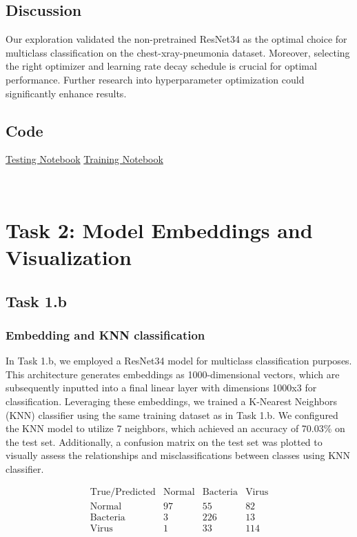 \documentclass{article}
\begin{document}
\subsection{Discussion}
Our exploration validated the non-pretrained ResNet34 as the optimal choice for multiclass classification on the chest-xray-pneumonia dataset. Moreover, selecting the right optimizer and learning rate decay schedule is crucial for optimal performance. Further research into hyperparameter optimization could significantly enhance results.

\subsection{Code}

\href{https://colab.research.google.com/drive/1FQ7bfbL8da7DRQiRvmgwdZXTTDB8sq8w}{Testing Notebook}
\href{https://colab.research.google.com/drive/157ERSNs66ypq-Svs68ftGqOEB_q_hAXD#scrollTo=ORtu8MojEoMq}{Training Notebook}


\
\section{Task 2: Model Embeddings and Visualization}
\subsection{Task 1.b}
\subsubsection{Embedding and KNN classification}
In Task 1.b, we employed a ResNet34 model for multiclass classification purposes. This architecture generates embeddings as 1000-dimensional vectors, which are subsequently inputted into a final linear layer with dimensions 1000x3 for classification. Leveraging these embeddings, we trained a K-Nearest Neighbors (KNN) classifier using the same training dataset as in Task 1.b. We configured the KNN model to utilize 7 neighbors, which achieved an accuracy of 70.03\% on the test set. Additionally, a confusion matrix on the test set was plotted to visually assess the relationships and misclassifications between classes using KNN classifier.


\[
\begin{array}{c|cccc}
\text{True/Predicted} & \text{Normal} & \text{Bacteria} & \text{Virus} \\
\hline
\text{Normal} & 97 & 55 & 82 \\
\text{Bacteria} & 3 & 226 & 13 \\
\text{Virus} & 1 & 33 & 114 \\
\end{array}
\]
\end{document}
